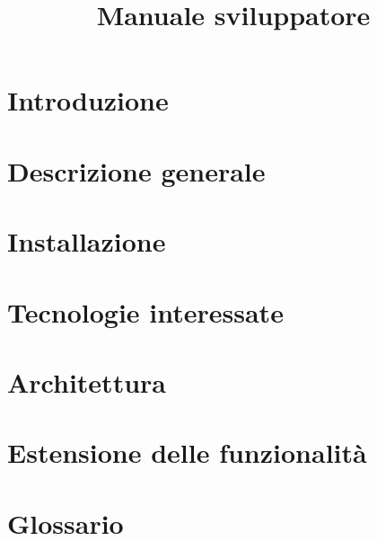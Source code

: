 \documentclass{article}
\title{Manuale sviluppatore}
\begin{document}


\section{Introduzione}%
\label{sec:introduzione}


\newpage
\section{Descrizione generale}%
\label{sec:descrizione_generale}


\newpage
\section{Installazione}%
\label{sec:installazione}


\newpage
\section{Tecnologie interessate}%
\label{sec:tecnologie_interessate}


\newpage
\section{Architettura}%
\label{sec:architettura}


\newpage
\section{Estensione delle funzionalità}%
\label{sec:estensione_funzionalita}


\newpage
\appendix
\section{Glossario}%
\label{sec:glossario}

\end{document}
